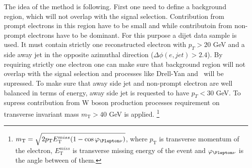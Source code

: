 The idea of the method is following. 
First one need to define a background region, which will not overlap with the signal selection.
Contribution from prompt electrons in this region have to be small and while contributoin from non-prompt electrons have to be dominant.
For this purpose a dijet data sample is used. It must contain strictly one reconstructed electron with $p_T > 20$ GeV
and a side away jet in the opposite azimuthal direction ($\Delta \phi (e,jet) > 2.4$).
By requiring strictly one electron one can make sure that background region will not overlap with the signal selection and processes 
like Drell-Yan and \ttbar~will be supressed.
To make sure that away side jet and non-prompt electron are well balanced in terms of energy, away side jet is
requested to have $p_T < 30$ GeV.
To supress contribution from W boson production processes requirement on transverse invariant mass 
$m_\mathrm{T} > 40$ GeV is applied.
\footnote{$m_\mathrm{T} = \sqrt{2 p_\mathrm{T} E_\mathrm{T}^{miss} (1-\cos\varphi_{\Plepton\nu})}$, where
$p_\mathrm{T}$ is transverse momentum of the electron, $E_\mathrm{T}^{miss}$ is transverse missing energy of the event
and $\varphi_{\Plepton\nu}$ is the angle between of them.}

